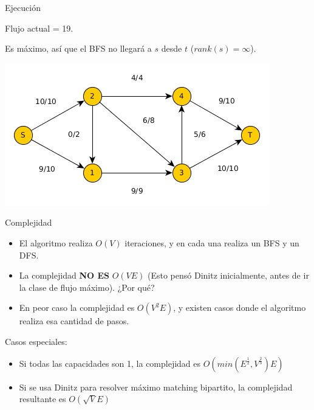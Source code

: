 \documentclass{beamer}
\begin{document}
\begin{frame}{Ejecución}

    Flujo actual = 19.
    
    Es máximo, así que el BFS no llegará a $s$ desde $t$ ($rank(s)=\infty$).
    
    \includegraphics[scale=0.6]{dinitz/dinitz27.png}
    
\end{frame}

\begin{frame}{Complejidad}
    \begin{itemize}
        \item El algoritmo realiza $O(V)$ iteraciones, y en cada una realiza un BFS y un DFS.
        \item La complejidad \textbf{NO ES} $O(VE)$ (Esto pensó Dinitz inicialmente, antes de ir la clase de flujo máximo). ¿Por qué?
        \item En peor caso la complejidad es $O(V^2 E)$, y existen casos donde el algoritmo realiza esa cantidad de pasos.
    \end{itemize}
    \pause
    Casos especiales:
    \begin{itemize}
        \item Si todas las capacidades son 1, la complejidad es $O(min(E^{\frac{1}{2}}, V^{\frac{2}{3}}) E)$
        \item Si se usa Dinitz para resolver máximo matching bipartito, la complejidad resultante es $O(\sqrt{V} E)$
    \end{itemize}
\end{frame}
\end{document}
